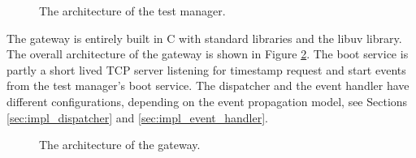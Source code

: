 \begin{figure}[h!]
    \centering
    \caption{The architecture of the test manager.}
    \label{fig:test_manager_impl_architecture}
\end{figure}

The gateway is entirely built in C with standard libraries and the libuv
library. The overall architecture of the gateway is shown in Figure
\ref{fig:gateway_impl_architecture}. The boot service is partly a short lived
TCP server listening for timestamp request and start events from the test
manager's boot service. The dispatcher and the event handler have different
configurations, depending on the event propagation model, see Sections
\ref{sec:impl_dispatcher} and \ref{sec:impl_event_handler}.

\begin{figure}[h!]
    \centering
    \caption{The architecture of the gateway.}
    \label{fig:gateway_impl_architecture}
\end{figure}

